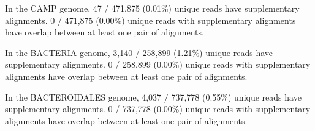 In the CAMP genome, 47 / 471,875 (0.01\%) unique reads have supplementary alignments. 0 / 471,875 (0.00\%) unique reads with supplementary alignments have overlap between at least one pair of alignments.

In the BACTERIA genome, 3,140 / 258,899 (1.21\%) unique reads have supplementary alignments. 0 / 258,899 (0.00\%) unique reads with supplementary alignments have overlap between at least one pair of alignments.

In the BACTEROIDALES genome, 4,037 / 737,778 (0.55\%) unique reads have supplementary alignments. 0 / 737,778 (0.00\%) unique reads with supplementary alignments have overlap between at least one pair of alignments.
\endinput